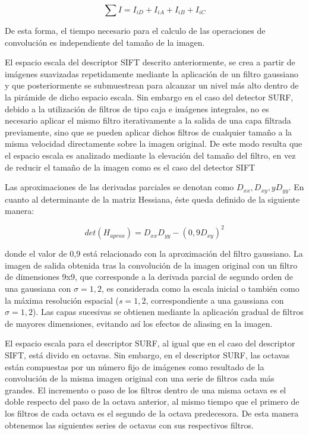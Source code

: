 \begin{equation}
  \sum I = I_{iD} + I_{iA} + I_{iB} + I_{iC}
\end{equation}

De esta forma, el tiempo necesario para el calculo de las operaciones de convolución es independiente del tamaño de la imagen.

El espacio escala del descriptor SIFT descrito anteriormente, se crea a partir de imágenes suavizadas repetidamente mediante la aplicación de un filtro gaussiano y que posteriormente se submuestrean para alcanzar un nivel más alto dentro de la pirámide de dicho espacio escala. Sin embargo en el caso del detector SURF, debido a la utilización de filtros de tipo caja e imágenes integrales, no es necesario aplicar el mismo filtro iterativamente a la salida de una capa filtrada previamente, sino que se pueden aplicar dichos filtros de cualquier tamaño a la misma velocidad directamente sobre la imagen original. De este modo resulta que el espacio escala es analizado mediante la elevación del tamaño del filtro, en vez de reducir el tamaño de la imagen como es el caso del detector SIFT

Las aproximaciones de las derivadas parciales se denotan como $D_{xx} , D_{xy} , y D_{yy}$. En cuanto al determinante de la matriz Hessiana, éste queda definido de la siguiente manera:

\begin{equation}
  det(H_{aprox}) = D_{xx} D_{yy} - (0,9 D_{xy})^2
\end{equation}

donde el valor de 0,9 está relacionado con la aproximación del filtro gaussiano. La imagen de salida obtenida tras la convolución de la imagen original con un filtro de dimensiones 9x9, que corresponde a la derivada parcial de segundo orden de una gaussiana con $\sigma = 1,2$, es considerada como la escala inicial o también como la máxima resolución espacial ($s = 1,2$, correspondiente a una gaussiana con $\sigma = 1,2$). Las capas sucesivas se obtienen mediante la aplicación gradual de filtros de mayores dimensiones, evitando así los efectos de aliasing en la imagen.

El espacio escala para el descriptor SURF, al igual que en el caso del descriptor SIFT, está divido en octavas. Sin embargo, en el descriptor SURF, las octavas están compuestas por un número fijo de imágenes como resultado de la convolución de la misma imagen original con una serie de filtros cada más grandes. El incremento o paso de los filtros dentro de una misma octava es el doble respecto del paso de la octava anterior, al mismo tiempo que el primero de los filtros de cada octava es el segundo de la octava predecesora. De esta manera obtenemos las siguientes series de octavas con sus respectivos filtros.

